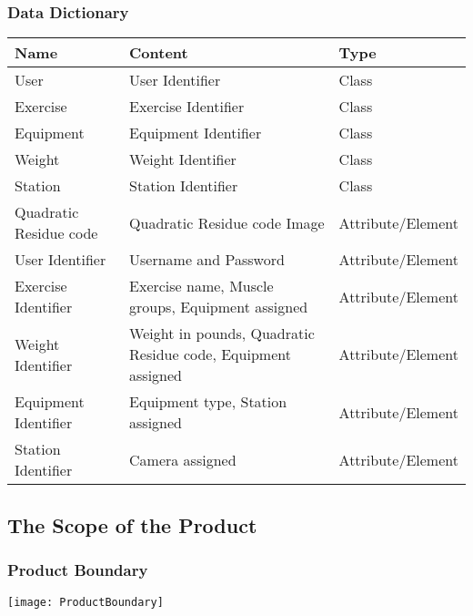 \documentclass{article}
\begin{document}
\subsubsection{Data Dictionary}
\begingroup
\begin{centering}
\begin{tabular}{|p{4cm} | p{6cm} | p{3cm}|}
    \hline
    \textbf{Name} & \textbf{Content} & \textbf{Type} \\
    \hline
    User & User Identifier & Class \\
    \hline
    Exercise & Exercise Identifier & Class \\
    \hline
    Equipment & Equipment Identifier & Class \\
    \hline
    Weight & Weight Identifier & Class \\
    \hline
    Station & Station Identifier & Class \\
    \hline
    Quadratic Residue code & Quadratic Residue code Image & Attribute/Element \\
    \hline
    User Identifier & Username and Password & Attribute/Element \\
    \hline
    Exercise Identifier & Exercise name, Muscle groups, Equipment assigned & Attribute/Element \\
    \hline
    Weight Identifier & Weight in pounds, Quadratic Residue code, Equipment assigned & Attribute/Element \\
    \hline
    Equipment Identifier & Equipment type, Station assigned & Attribute/Element \\
    \hline
    Station Identifier & Camera assigned & Attribute/Element \\
    \hline
\end{tabular}
\end{centering}
\endgroup

\subsection{The Scope of the Product}

\subsubsection{Product Boundary}
\begingroup
\begin{centering}
\texttt{[image: ProductBoundary]}
\end{centering}
\endgroup
\end{document}
